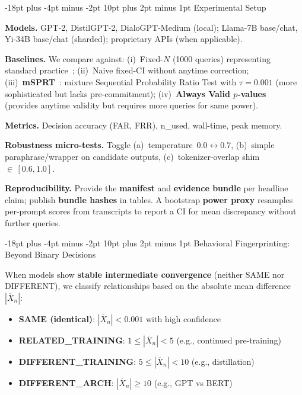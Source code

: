 \documentclass[11pt]{article}
\makeatletter
\renewcommand\section{\@startsection{section}{1}{\z@}%
  {-18pt plus -4pt minus -2pt}%
  {10pt plus 2pt minus 1pt}%
  {\normalfont\Large\bfseries}}
\makeatother
\begin{document}
\section{Experimental Setup}

\textbf{Models.} GPT-2, DistilGPT-2, DialoGPT-Medium (local); Llama-7B base/chat, Yi-34B base/chat (sharded); proprietary APIs (when applicable).

\textbf{Baselines.} We compare against: (i)~Fixed-$N$ (1000 queries) representing standard practice~\cite{hendrycks2021many}; (ii)~Naive fixed-CI without anytime correction; (iii)~\textbf{mSPRT}~\cite{johari2017peeking}: mixture Sequential Probability Ratio Test with $\tau=0.001$ (more sophisticated but lacks pre-commitment); (iv)~\textbf{Always Valid $p$-values}~\cite{ramdas2023gametheoretic} (provides anytime validity but requires more queries for same power).

\textbf{Metrics.} Decision accuracy (FAR, FRR), n\_used, wall-time, peak memory.

\textbf{Robustness micro-tests.} Toggle (a)~temperature~$0.0 \leftrightarrow 0.7$, (b)~simple paraphrase/wrapper on candidate outputs, (c)~tokenizer-overlap shim~${\in}\,[0.6,1.0]$.

\textbf{Reproducibility.} Provide the \textbf{manifest} and \textbf{evidence bundle} per headline claim; publish \textbf{bundle hashes} in tables. A bootstrap \textbf{power proxy} resamples per-prompt scores from transcripts to report a CI for mean discrepancy without further queries.

\section{Behavioral Fingerprinting: Beyond Binary Decisions}
\label{sec:behavioral-fingerprinting}

When models show \textbf{stable intermediate convergence} (neither SAME nor DIFFERENT), we classify relationships based on the absolute mean difference $|\overline{X}_n|$:
\begin{itemize}
\item \textbf{SAME (identical)}: $|\overline{X}_n| < 0.001$ with high confidence
\item \textbf{RELATED\_TRAINING}: $1 \leq |\overline{X}_n| < 5$ (e.g., continued pre-training)
\item \textbf{DIFFERENT\_TRAINING}: $5 \leq |\overline{X}_n| < 10$ (e.g., distillation)
\item \textbf{DIFFERENT\_ARCH}: $|\overline{X}_n| \geq 10$ (e.g., GPT vs BERT)
\end{itemize}
\end{document}
